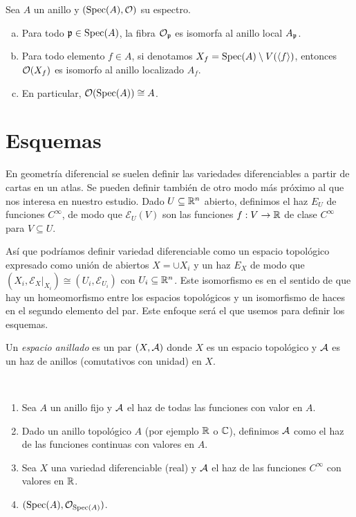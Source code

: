 \documentclass[GA.tex]{subfiles}
\begin{document}
\begin{prop}
Sea $A$ un anillo y $(\operatorname{Spec}(A),{\mathcal O})$ su espectro.
\begin{enumerate}[(a)]
\item Para todo ${\mathfrak{p}}\in\operatorname{Spec}(A)$, la fibra ${\mathcal O}_{\mathfrak{p}}$ es isomorfa al anillo local $A_{\mathfrak{p}}$.
\item Para todo elemento $f\in A$, si denotamos $X_f=\operatorname{Spec}(A)\setminus V(\langle{f}\rangle)$, entonces ${\mathcal O}(X_f)$ es isomorfo al anillo localizado $A_f$.
\item En particular, ${\mathcal O}(\operatorname{Spec}(A))\cong A$. 
\end{enumerate} 
\end{prop}

\section{Esquemas}

En geometría diferencial se suelen definir las variedades diferenciables a partir de cartas en un atlas. Se pueden definir también de otro modo más próximo al que nos interesa en nuestro estudio. Dado $U\subseteq\mathbb{R}^n$ abierto, definimos el haz $E_U$ de funciones $C^{\infty}$, de modo que $\mathcal{E}_U(V)$ son las funciones $f:V\to\mathbb{R}$ de clase $C^{\infty}$ para $V\subseteq U$.

 Así que podríamos definir variedad diferenciable como un espacio topológico expresado como unión de abiertos $X=\cup X_i$ y un haz $E_X$ de modo que $(X_i,\mathcal{E}_X|_{X_i})\cong (U_i,\mathcal{E}_{U_i})$ con $U_i\subseteq\mathbb{R}^n$. Este isomorfismo es en el sentido de que hay un homeomorfismo entre los espacios topológicos y un isomorfismo de haces en el segundo elemento del par. Este enfoque será el que usemos para definir los esquemas. 
 
 
 \begin{defi}
 Un \emph{espacio anillado} es un par $(X,\mathcal{A})$ donde $X$ es un espacio topológico y $\mathcal{A}$ es un haz de anillos (comutativos con unidad) en $X$.
 \end{defi}
 
 \begin{ejs}\
 \begin{enumerate}
 \item Sea $A$ un anillo fijo y $\mathcal{A}$ el haz de todas las funciones con valor en $A$. 
 \item Dado un anillo topológico $A$ (por ejemplo $\mathbb{R}$ o $\mathbb{C}$), definimos $\mathcal{A}$ como el haz de las funciones continuas con valores en $A$.
 \item Sea $X$ una variedad diferenciable (real) y $\mathcal{A}$ el haz de las funciones $C^{\infty}$ con valores en $\mathbb{R}$.
 \item $(\operatorname{Spec}(A), {\mathcal O}_{\operatorname{Spec}(A)})$. 
 \end{enumerate}
 
 \end{ejs}
 
\end{document}
